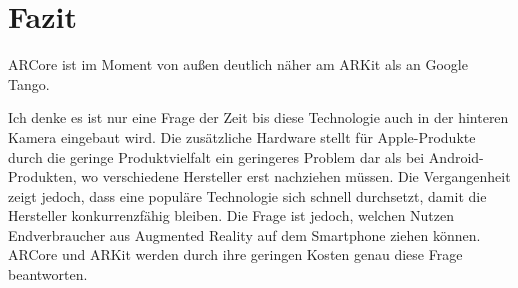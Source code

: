 
\section{Fazit}
ARCore ist im Moment von außen deutlich näher am ARKit als an Google Tango.

%
Ich denke es ist nur eine Frage der Zeit bis diese Technologie auch in der hinteren Kamera eingebaut wird. Die zusätzliche Hardware stellt für Apple-Produkte durch die geringe Produktvielfalt ein geringeres Problem dar als bei Android-Produkten, wo verschiedene Hersteller erst nachziehen müssen. Die Vergangenheit zeigt jedoch, dass eine populäre Technologie sich schnell durchsetzt, damit die Hersteller konkurrenzfähig bleiben. Die Frage ist jedoch, welchen Nutzen Endverbraucher aus Augmented Reality auf dem Smartphone ziehen können. ARCore und ARKit werden durch ihre geringen Kosten genau diese Frage beantworten.